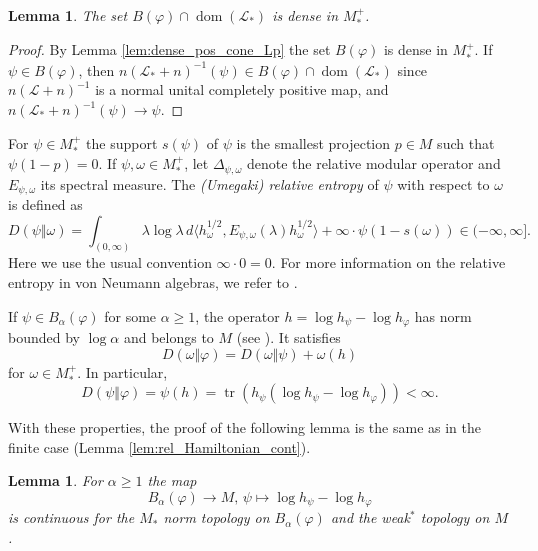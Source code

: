 \documentclass[12pt,a4paper]{amsart}
\newcommand{\1}{\mathds{1}}
\newcommand{\tr}{\operatorname{tr}}
\renewcommand{\phi}{\varphi}
\renewcommand{\L}{\mathcal L}
\newcommand{\dom}{\operatorname{dom}}
\theoremstyle{plain}
\newtheorem{lemma}[proposition]{Lemma}
\theoremstyle{definition}
\theoremstyle{remark}
\begin{document}
\begin{lemma}
The set $B(\phi)\cap \dom(\L_\ast)$ is dense in $M_\ast^+$.
\end{lemma}
\begin{proof}
By Lemma \ref{lem:dense_pos_cone_Lp} the set $B(\phi)$ is dense in $M_\ast^+$. If $\psi\in B(\phi)$, then $n(\L_\ast+n)^{-1}(\psi)\in B(\phi)\cap \dom(\L_\ast)$ since $n(\L+n)^{-1}$ is a normal unital completely positive map, and $n(\L_\ast+n)^{-1}(\psi)\to \psi$.
\end{proof}

For $\psi\in M_\ast^+$ the support $s(\psi)$ of $\psi$ is the smallest projection $p\in M$ such that $\psi(1-p)=0$. If $\psi,\omega\in M_\ast^+$, let $\Delta_{\psi,\omega}$ denote the relative modular operator and $E_{\psi,\omega}$ its spectral measure. The \emph{(Umegaki) relative entropy} of $\psi$ with respect to $\omega$ is defined as
\begin{equation*}
D(\psi\Vert\omega)=\int_{(0,\infty)}\lambda \log\lambda\,d\langle h_\omega^{1/2},E_{\psi,\omega}(\lambda) h_\omega^{1/2}\rangle+\infty\cdot\psi(1-s(\omega))\in (-\infty,\infty].
\end{equation*}
Here we use the usual convention $\infty\cdot 0=0$. For more information on the relative entropy in von Neumann algebras, we refer to \cite{Ara76,Ara78,Hia18}.

If $\psi\in B_\alpha(\phi)$ for some $\alpha\geq 1$, the operator $h=\log h_\psi-\log h_\phi$ has norm bounded by $\log\alpha$ and belongs to $M$ (see \cite[Theorem B.1]{Hia18}). It satisfies 
\begin{equation*}
D(\omega\Vert \phi)=D(\omega\Vert \psi)+\omega(h)
\end{equation*}
for $\omega\in M_\ast^+$. In particular,
\begin{equation*}
D(\psi\Vert \phi)=\psi(h)=\tr(h_\psi(\log h_\psi-\log h_\phi))<\infty.
\end{equation*}

With these properties, the proof of the following lemma is the same as in the finite case (Lemma \ref{lem:rel_Hamiltonian_cont}).

\begin{lemma}\label{lem:rel_Hamiltonian_cont_II}
For $\alpha\geq 1$ the map
\begin{equation*}
B_\alpha(\phi)\to M,\,\psi\mapsto \log h_\psi-\log h_\phi
\end{equation*}
is continuous for the $M_\ast$ norm topology on $B_\alpha(\phi)$ and the weak$^\ast$ topology on $M$.
\end{lemma}
\end{document}
